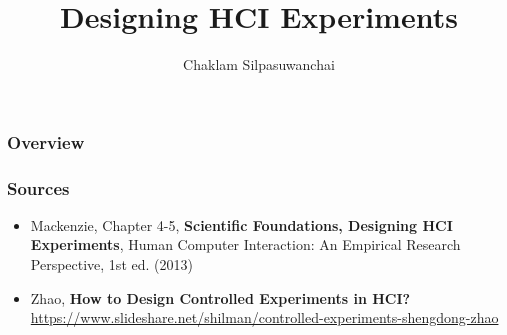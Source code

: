 \documentclass{beamer}
\title[Designing HCI Experiments]{Designing HCI Experiments} %
\author{Chaklam Silpasuwanchai} %
\institute[AIT] %
{
Asian Institute of Technology \\ %
\medskip
\textit{chaklam@ait.asia} %
}
\date{} %
\begin{document}
\begin{frame}
\titlepage %
\end{frame}

\begin{frame}
\frametitle{Overview} %
\tableofcontents
\end{frame}


\begin{frame}
\frametitle{Sources} 
\begin{itemize}
	\item Mackenzie, Chapter 4-5, \textbf{Scientific Foundations, Designing HCI Experiments},  Human Computer Interaction: An Empirical Research Perspective, 1st ed. (2013) 
	\item Zhao, \textbf{How to Design Controlled Experiments in HCI?} \url{https://www.slideshare.net/shilman/controlled-experiments-shengdong-zhao}
\end{itemize}
\end{frame}




\end{document}
